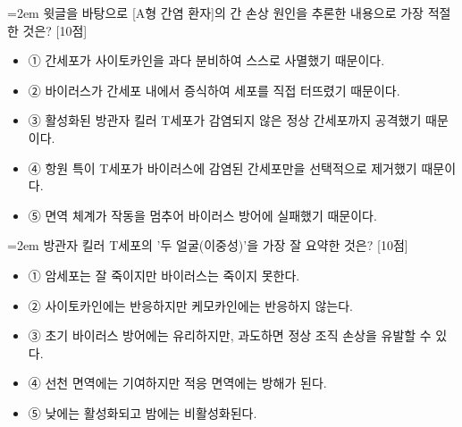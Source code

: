 \documentclass[10pt,a4paper]{article}
\newcommand{\qnum}[1]{%
  \tikz[baseline=(num.base)]{%
    \node[circle, fill=numCircle, text=white, inner sep=0pt,
          minimum size=18pt, font=\small\bfseries] (num) {#1};%
  }%
}
\newcommand{\pts}[1]{%
  \hfill\textcolor{ptsBadge}{[#1점]}%
}
\begin{document}
\vspace{4mm}
\begin{minipage}{\columnwidth}
{\hangindent=2em
\qnum{47}\enspace 윗글을 바탕으로 [A형 간염 환자]의 간 손상 원인을 추론한 내용으로 가장 적절한 것은? \pts{10}
\par}

\vspace{3mm}
\begin{itemize}[leftmargin=2.5em, labelsep=0.3em, label={}, itemsep=4pt, parsep=1pt, topsep=0pt]
  \item ① 간세포가 사이토카인을 과다 분비하여 스스로 사멸했기 때문이다.
  \item ② 바이러스가 간세포 내에서 증식하여 세포를 직접 터뜨렸기 때문이다.
  \item ③ 활성화된 방관자 킬러 T세포가 감염되지 않은 정상 간세포까지 공격했기 때문이다.
  \item ④ 항원 특이 T세포가 바이러스에 감염된 간세포만을 선택적으로 제거했기 때문이다.
  \item ⑤ 면역 체계가 작동을 멈추어 바이러스 방어에 실패했기 때문이다.
\end{itemize}
\end{minipage}
\vspace{4mm}

\vspace{4mm}
\begin{minipage}{\columnwidth}
{\hangindent=2em
\qnum{48}\enspace 방관자 킬러 T세포의 '두 얼굴(이중성)'을 가장 잘 요약한 것은? \pts{10}
\par}

\vspace{3mm}
\begin{itemize}[leftmargin=2.5em, labelsep=0.3em, label={}, itemsep=4pt, parsep=1pt, topsep=0pt]
  \item ① 암세포는 잘 죽이지만 바이러스는 죽이지 못한다.
  \item ② 사이토카인에는 반응하지만 케모카인에는 반응하지 않는다.
  \item ③ 초기 바이러스 방어에는 유리하지만, 과도하면 정상 조직 손상을 유발할 수 있다.
  \item ④ 선천 면역에는 기여하지만 적응 면역에는 방해가 된다.
  \item ⑤ 낮에는 활성화되고 밤에는 비활성화된다.
\end{itemize}
\end{minipage}
\vspace{4mm}
\end{document}

